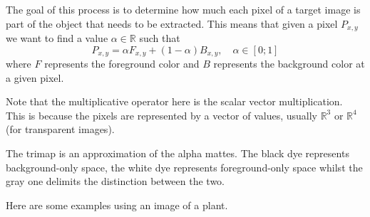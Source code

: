 \documentclass[a4paper]{article}
\begin{document}
The goal of this process is to determine
how much each pixel of a target image is part of the
object that needs to be extracted.
This means that given a pixel \(P_{x,y}\)
we want to find a value \(\alpha \in \mathbb{R}\) such that
\[
    P_{x,y} = \alpha F_{x,y} + (1-\alpha) B_{x,y},
    \quad \alpha \in [0;1]
\]
where \(F\) represents the foreground color
and \(B\) represents the background color at a given pixel.

Note that the multiplicative operator here is the scalar vector multiplication.
This is because the pixels are represented by a vector of values,
usually \({\mathbb{R}}^3\) or \({\mathbb{R}}^4\) (for transparent images).

The trimap is an approximation of the alpha mattes.
The black dye represents background-only space, the white dye
represents foreground-only space whilst the gray one
delimits the distinction between the two.

Here are some examples using an image of a plant.
\end{document}
